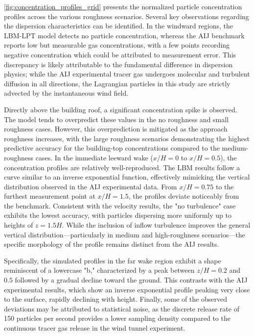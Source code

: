 \autoref{fig:concentration_profiles_grid} presents the normalized particle concentration profiles across the various roughness scenarios. Several key observations regarding the dispersion characteristics can be identified. In the windward regions, the LBM-LPT model detects no particle concentration, whereas the AIJ benchmark reports low but measurable gas concentrations, with a few points recording negative concentration which could be attributed to measurement error. This discrepancy is likely attributable to the fundamental difference in dispersion physics; while the AIJ experimental tracer gas undergoes molecular and turbulent diffusion in all directions, the Lagrangian particles in this study are strictly advected by the instantaneous wind field. 

Directly above the building roof, a significant concentration spike is observed. The model tends to overpredict these values in the no roughness and small roughness cases. However, this overprediction is mitigated as the approach roughness increases, with the large roughness scenarios demonstrating the highest predictive accuracy for the building-top concentrations compared to the medium-roughness cases. In the immediate leeward wake ($x/H = 0$ to $x/H = 0.5$), the concentration profiles are relatively well-reproduced. The LBM results follow a curve similar to an inverse exponential function, effectively mimicking the vertical distribution observed in the AIJ experimental data. From $x/H = 0.75$ to the furthest measurement point at $x/H = 1.5$, the profiles deviate noticeably from the benchmark. Consistent with the velocity results, the "no turbulence" case exhibits the lowest accuracy, with particles dispersing more uniformly up to heights of $z = 1.5H$. While the inclusion of inflow turbulence improves the general vertical distribution—particularly in medium and high-roughness scenarios—the specific morphology of the profile remains distinct from the AIJ results. 

Specifically, the simulated profiles in the far wake region exhibit a shape reminiscent of a lowercase "b," characterized by a peak between $z/H = 0.2$ and $0.5$ followed by a gradual decline toward the ground. This contrasts with the AIJ experimental results, which show an inverse exponential profile peaking very close to the surface, rapidly declining with height. Finally, some of the observed deviations may be attributed to statistical noise, as the discrete release rate of 150 particles per second provides a lower sampling density compared to the continuous tracer gas release in the wind tunnel experiment.

